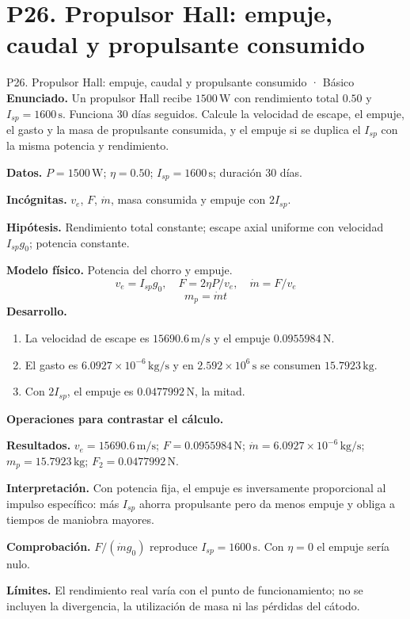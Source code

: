 \section{P26. Propulsor Hall: empuje, caudal y propulsante consumido}
\begin{studiumworked}{P26. Propulsor Hall: empuje, caudal y propulsante consumido · Básico}
\textbf{Enunciado.} Un propulsor Hall recibe $1500\,\mathrm W$ con rendimiento total $0.50$ y $I_{sp}=1600\,\mathrm s$. Funciona 30 días seguidos. Calcule la velocidad de escape, el empuje, el gasto y la masa de propulsante consumida, y el empuje si se duplica el $I_{sp}$ con la misma potencia y rendimiento.

\textbf{Datos.} $P=1500\,\mathrm W$; $\eta=0.50$; $I_{sp}=1600\,\mathrm s$; duración 30 días.

\textbf{Incógnitas.} $v_e$, $F$, $\dot m$, masa consumida y empuje con $2I_{sp}$.

\textbf{Hipótesis.} Rendimiento total constante; escape axial uniforme con velocidad $I_{sp}g_0$; potencia constante.

\textbf{Modelo físico.} Potencia del chorro y empuje.
\[v_e=I_{sp}g_0,\quad F=2\eta P/v_e,\quad \dot m=F/v_e\]
\[m_p=\dot mt\]
\textbf{Desarrollo.}
\begin{enumerate}
\item La velocidad de escape es $15690.6\,\mathrm{m/s}$ y el empuje $0.0955984\,\mathrm N$.
\item El gasto es $6.0927\times10^{-6}\,\mathrm{kg/s}$ y en $2.592\times10^{6}\,\mathrm s$ se consumen $15.7923\,\mathrm{kg}$.
\item Con $2I_{sp}$, el empuje es $0.0477992\,\mathrm N$, la mitad.
\end{enumerate}
\textbf{Operaciones para contrastar el cálculo.}

\textbf{Resultados.} $v_e=15690.6\,\mathrm{m/s}$; $F=0.0955984\,\mathrm N$; $\dot m=6.0927\times10^{-6}\,\mathrm{kg/s}$; $m_p=15.7923\,\mathrm{kg}$; $F_2=0.0477992\,\mathrm N$.

\textbf{Interpretación.} Con potencia fija, el empuje es inversamente proporcional al impulso específico: más $I_{sp}$ ahorra propulsante pero da menos empuje y obliga a tiempos de maniobra mayores.

\textbf{Comprobación.} $F/(\dot mg_0)$ reproduce $I_{sp}=1600\,\mathrm s$. Con $\eta=0$ el empuje sería nulo.

\textbf{Límites.} El rendimiento real varía con el punto de funcionamiento; no se incluyen la divergencia, la utilización de masa ni las pérdidas del cátodo.
\end{studiumworked}
